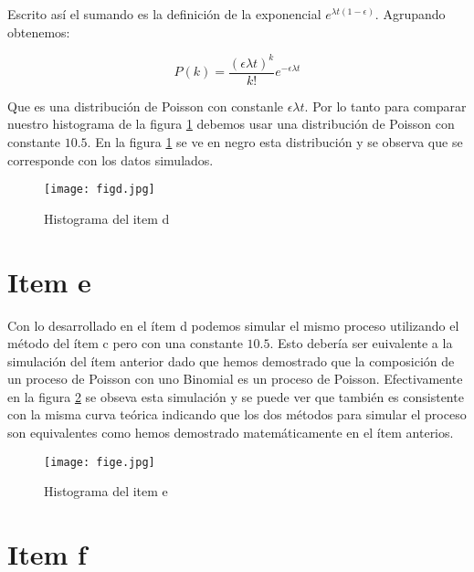 \documentclass{article}
\begin{document}
Escrito así el sumando es la definición de la exponencial $e^{\lambda t(1- \epsilon)}$.
Agrupando obtenemos:

$$
P(k) = \frac{(\epsilon \lambda t)^k}{k!} e^{-\epsilon \lambda t}
$$

Que es una distribución de Poisson con constanle $\epsilon \lambda t$.
Por lo tanto para comparar nuestro histograma de la figura \ref{fig:itemd} debemos usar una distribución de Poisson con constante $10.5$.
En la figura \ref{fig:itemd} se ve en negro esta distribución y se observa que se corresponde con los datos simulados.


\begin{figure}
\centering
\texttt{[image: figd.jpg]}
\caption[]{Histograma del item d}
\label{fig:itemd}
\end{figure}

\section{Item e}

Con lo desarrollado en el ítem d podemos simular el mismo proceso utilizando el método del ítem c pero con una constante $10.5$.
Esto debería ser euivalente a la simulación del ítem anterior dado que hemos demostrado que la composición de un proceso de Poisson con uno Binomial es un proceso de Poisson.
Efectivamente en la figura \ref{fig:iteme} se obseva esta simulación y se puede ver que también es consistente con la misma curva teórica indicando que los dos métodos para simular el proceso son equivalentes como hemos demostrado matemáticamente en el ítem anterios.

\begin{figure}
\centering
\texttt{[image: fige.jpg]}
\caption[]{Histograma del item e}
\label{fig:iteme}
\end{figure}

\section{Item f}
\end{document}
